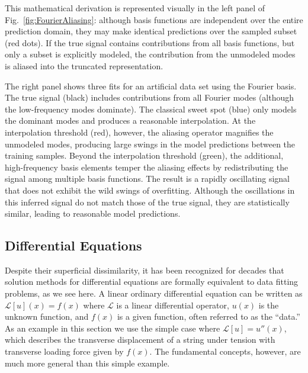 \documentclass[twocolumn,aps,prx,superscriptaddress,10pt]{revtex4-2}
\newcommand{\0}{\bm{0}}
\begin{document}
This mathematical derivation is represented visually in the left panel of Fig.~\ref{fig:FourierAliasing}: although basis functions are independent over the entire prediction domain, they may make identical predictions over the sampled subset (red dots).
If the true signal contains contributions from all basis functions, but only a subset is explicitly modeled, the contribution from the unmodeled modes is aliased into the truncated representation.


The right panel shows three fits for an artificial data set using the Fourier basis.
The true signal (black) includes contributions from all Fourier modes (although the low-frequency modes dominate).
The classical sweet spot (blue) only models the dominant modes and produces a reasonable interpolation.
At the interpolation threshold (red), however, the aliasing operator magnifies the unmodeled modes, producing large swings in the model predictions between the training samples.
Beyond the interpolation threshold (green), the additional, high-frequency basis elements temper the aliasing effects by redistributing the signal among multiple basis functions.
The result is a rapidly oscillating signal that does not exhibit the wild swings of overfitting.
Although the oscillations in this inferred signal do not match those of the true signal, they are statistically similar, leading to reasonable model predictions.

\subsection{Differential Equations}
\label{sec:collocation}

Despite their superficial dissimilarity, it has been recognized for decades that solution methods for differential equations are formally equivalent to data fitting problems, as we see here.
A linear ordinary differential equation can be written as $\mathcal{L}[u](x) = f(x)$ where $\mathcal{L}$ is a linear differential operator, $u(x)$ is the unknown function, and $f(x)$ is a given function, often referred to as the ``data.''
As an example in this section we use the simple case where $\mathcal{L}[u] = u''(x)$, which describes the transverse displacement of a string under tension with transverse loading force given by $f(x)$.  The fundamental concepts, however,  are much more general than this simple example.
\end{document}
